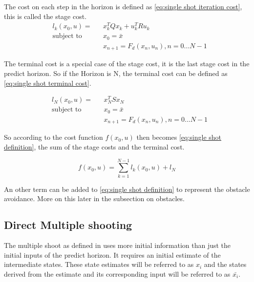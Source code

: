 			The cost on each step in the horizon is defined as \eqref{eq:single shot iteration cost}, this is called the stage cost.
			\begin{equation}
				\begin{aligned}
				& l_k(x_0,u) = &&  x_k^T Q x_k  +  u_k^T R u_k \\
				& \text{subject to}			&& x_0 = \bar{x} \\
				& 							&&  x_{n+1} = F_d(x_n,u_n), n=0...N-1
				\end{aligned}
				\label{eq:single shot iteration cost}
			\end{equation}
			
			The terminal cost is a special case of the stage cost, it is the last stage cost in the predict horizon. So if the Horizon is N, the terminal cost can be defined as \eqref{eq:single shot terminal cost}.
			
			\begin{equation}
				\begin{aligned}
					& l_N(x_0,u) = && x_N^TSx_N \\
					& \text{subject to}			&& x_0 = \bar{x} \\
					& 							&&  x_{n+1} = F_d(x_n,u_n), n=0...N-1
				\end{aligned}
				\label{eq:single shot terminal cost}
			\end{equation}
			
			So according to \cite{Diehl2005} the cost function $f(x_0,u)$ then becomes \eqref{eq:single shot definition}, the sum of the stage costs and the terminal cost.
			
			\begin{equation}
				f(x_0,u) = \sum_{k=1}^{N-1} l_k(x_0,u) + l_N
				\label{eq:single shot definition}
			\end{equation}
			
			An other term can be added to \eqref{eq:single shot definition} to represent the obstacle avoidance. More on this later in the subsection on obstacles.
		\subsection{Direct Multiple shooting}
			The multiple shoot as defined in \cite{Diehl2005} uses more initial information than just the initial inputs of the predict horizon. It requires an initial estimate of the intermediate states. These state estimates will be referred to as $x_i$ and the states derived from the estimate and its corresponding input will be referred to as $\bar{x_i}$. 
			
